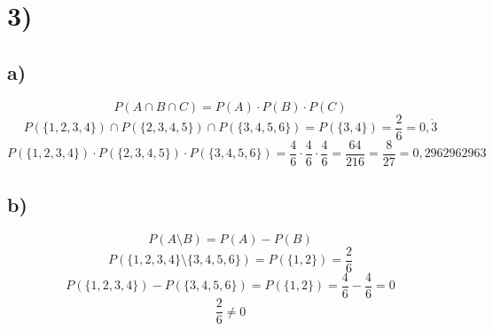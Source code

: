 \documentclass{article}
\begin{document}
\section*{3)}

  \subsection*{a)}
    \[ P(A \cap B \cap C) = P(A) \cdot P(B) \cdot P(C) \]
    \[ P(\{1, 2, 3, 4\}) \cap P(\{2, 3, 4, 5\}) \cap P(\{3, 4, 5, 6\}) = P(\{3, 4\}) = \frac{2}{6} = 0,\dot{3} \]
    \[ P(\{1, 2, 3, 4\}) \cdot P(\{2, 3, 4, 5\}) \cdot P(\{3, 4, 5, 6\}) = \frac{4}{6} \cdot \frac{4}{6} \cdot \frac{4}{6} = \frac{64}{216} = \frac{8}{27} = 0,2962962963 \]

  \subsection*{b)}
    \[ P(A \setminus B) = P(A) - P(B) \]
    \[ P(\{1, 2, 3, 4\} \setminus \{3, 4, 5, 6\}) = P(\{1, 2\}) = \frac{2}{6} \]
    \[ P(\{1, 2, 3, 4\}) - P(\{3, 4, 5, 6\}) = P(\{1, 2\}) = \frac{4}{6} - \frac{4}{6} = 0 \]
    \[ \frac{2}{6} \neq 0 \]
\end{document}

